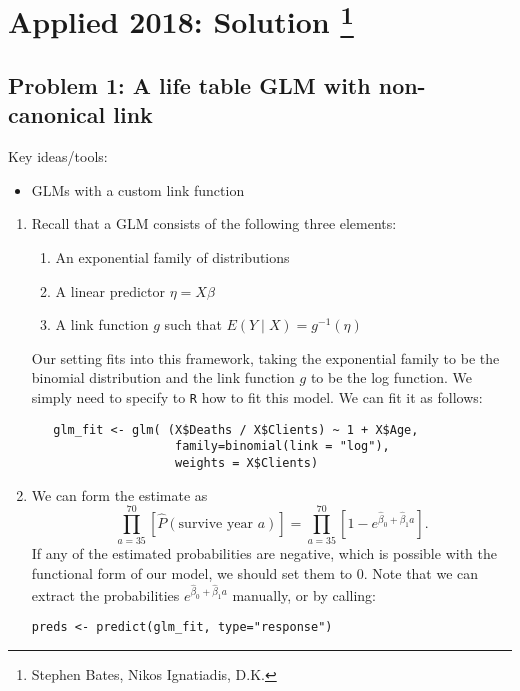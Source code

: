 \section{Applied 2018: Solution \footnote{Stephen Bates, Nikos Ignatiadis, D.K. }}



\subsection*{Problem 1: A life table GLM with non-canonical link}
Key ideas/tools:
\begin{itemize}
  \item GLMs with a custom link function
\end{itemize}

\begin{enumerate}[label=(\alph*)]
\item
  Recall that a GLM consists of the following three elements:
  \begin{enumerate}[label=(\arabic*)]
    \item An exponential family of distributions
    \item A linear predictor $\eta = X \beta$
    \item A link function $g$ such that $E(Y \mid X) = g^{-1}(\eta)$
  \end{enumerate}

  Our setting fits into this framework, taking the exponential family to be the binomial distribution and the link function $g$ to be the log function. We simply need to specify to \texttt{R} how to fit this model. We can fit it as follows:
  \begin{lstlisting}
   glm_fit <- glm( (X$Deaths / X$Clients) ~ 1 + X$Age, 
                    family=binomial(link = "log"), 
                    weights = X$Clients)
  \end{lstlisting}

\item
  We can form the estimate as 
  \begin{equation*}
    \prod_{a = 35}^{70}[\hat{P}(\text{survive year $a$})] = \prod_{a = 35}^{70}[1 - e^{\hat{\beta}_0 + \hat{\beta}_1 a}].
  \end{equation*}
  If any of the estimated probabilities are negative, which is possible with the functional form of our model, we should set them to 0. Note that we can extract the probabilities $e^{\hat{\beta}_0 + \hat{\beta}_1 a}$ manually, or by calling:

\begin{lstlisting}
preds <- predict(glm_fit, type="response")
\end{lstlisting}

\end{enumerate}

